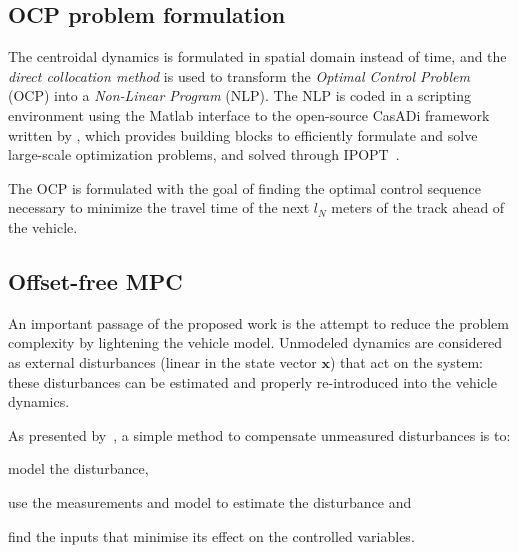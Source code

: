 \documentclass[conference]{IEEEtran} %
\renewcommand{\vec}[1]{\boldsymbol{#1}}
\begin{document}


\subsection{OCP problem formulation}

The centroidal dynamics is formulated in spatial domain instead of time, and the \emph{direct collocation method} is used to transform the \emph{Optimal Control Problem} (OCP) into a \emph{Non-Linear Program} (NLP). The NLP is coded in a scripting environment using the Matlab interface to the open-source CasADi framework written by \cite{Andersson2019}, which provides building
blocks to efficiently formulate and solve large-scale optimization problems, and solved through IPOPT~\cite{Wachter2006}.

The OCP is formulated with the goal of finding the optimal control sequence necessary to minimize the travel time of the next $l_N$ meters of the track ahead of the vehicle.

\subsection{Offset-free MPC}
\label{sec:offsetfree}

An important passage of the proposed work is the attempt to reduce the problem complexity by lightening the vehicle model.
Unmodeled dynamics are considered as external disturbances (linear in the state vector $\vec x$) that act on the system: these disturbances can be estimated and properly re-introduced into the vehicle dynamics.

As presented by~\citet{Pannocchia2015}, a simple method to compensate unmeasured disturbances is to:
\begin{enumerate*}[label=(\roman*)]
	\item model the disturbance,
	\item use the measurements and model to estimate the disturbance and
	\item find the inputs that minimise its effect on the controlled variables.
\end{enumerate*}
\end{document}
